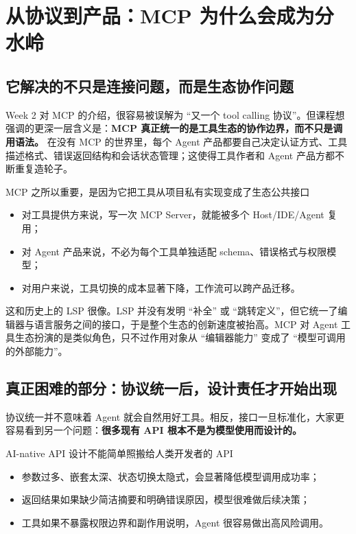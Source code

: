 \section{从协议到产品：MCP 为什么会成为分水岭}

\subsection{它解决的不只是连接问题，而是生态协作问题}
Week 2 对 MCP 的介绍，很容易被误解为 ``又一个 tool calling 协议''。但课程想强调的更深一层含义是：\textbf{MCP 真正统一的是工具生态的协作边界，而不只是调用语法。} 在没有 MCP 的世界里，每个 Agent 产品都要自己决定认证方式、工具描述格式、错误返回结构和会话状态管理；这使得工具作者和 Agent 产品方都不断重复造轮子。

\begin{importantbox}{MCP 之所以重要，是因为它把工具从项目私有实现变成了生态公共接口}
\begin{itemize}
    \item 对工具提供方来说，写一次 MCP Server，就能被多个 Host/IDE/Agent 复用；
    \item 对 Agent 产品来说，不必为每个工具单独适配 schema、错误格式与权限模型；
    \item 对用户来说，工具切换的成本显著下降，工作流可以跨产品迁移。
\end{itemize}
\end{importantbox}

这和历史上的 LSP 很像。LSP 并没有发明 ``补全'' 或 ``跳转定义''，但它统一了编辑器与语言服务之间的接口，于是整个生态的创新速度被抬高。MCP 对 Agent 工具生态扮演的是类似角色，只不过作用对象从 ``编辑器能力'' 变成了 ``模型可调用的外部能力''。

\subsection{真正困难的部分：协议统一后，设计责任才开始出现}
协议统一并不意味着 Agent 就会自然用好工具。相反，接口一旦标准化，大家更容易看到另一个问题：\textbf{很多现有 API 根本不是为模型使用而设计的。}

\begin{warningbox}{AI-native API 设计不能简单照搬给人类开发者的 API}
\begin{itemize}
    \item 参数过多、嵌套太深、状态切换太隐式，会显著降低模型调用成功率；
    \item 返回结果如果缺少简洁摘要和明确错误原因，模型很难做后续决策；
    \item 工具如果不暴露权限边界和副作用说明，Agent 很容易做出高风险调用。
\end{itemize}
\end{warningbox}

